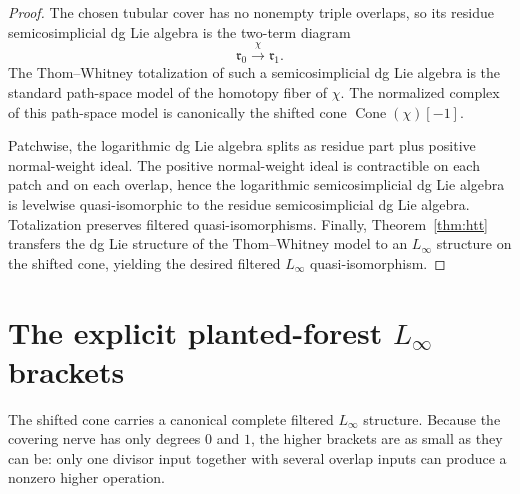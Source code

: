 \begin{proof}
The chosen tubular cover has no nonempty triple overlaps, so its residue
semicosimplicial dg Lie algebra is the two-term diagram
\[
\mathfrak r_0 \xrightarrow{\chi} \mathfrak r_1.
\]
The Thom--Whitney totalization of such a semicosimplicial dg Lie algebra is the
standard path-space model of the homotopy fiber of $\chi$.  The normalized
complex of this path-space model is canonically the shifted cone
$\operatorname{Cone}(\chi)[-1]$.

Patchwise, the logarithmic dg Lie algebra splits as residue part plus positive
normal-weight ideal.  The positive normal-weight ideal is contractible on each
patch and on each overlap, hence the logarithmic semicosimplicial dg Lie algebra
is levelwise quasi-isomorphic to the residue semicosimplicial dg Lie algebra.
Totalization preserves filtered quasi-isomorphisms.  Finally,
Theorem~\ref{thm:htt} transfers the dg Lie structure of the Thom--Whitney
model to an $L_\infty$ structure on the shifted cone, yielding the desired
filtered $L_\infty$ quasi-isomorphism.
\end{proof}

\section{The explicit planted-forest \texorpdfstring{$L_\infty$}{L-infinity} brackets}
\label{sec:fm3-explicit-linf}

The shifted cone carries a canonical complete filtered $L_\infty$ structure.
Because the covering nerve has only degrees $0$ and $1$, the higher brackets are
as small as they can be: only one divisor input together with several overlap
inputs can produce a nonzero higher operation.

